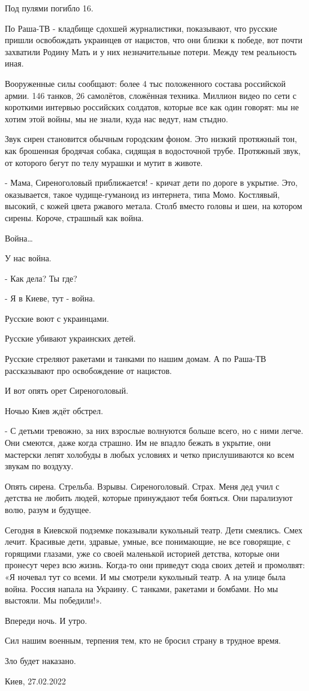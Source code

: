 Под пулями погибло 16. 

По Раша-ТВ - кладбище сдохшей журналистики, показывают, что русские пришли
освобождать украинцев от нацистов, что они близки к победе, вот почти захватили
Родину Мать и у них незначительные потери. Между тем реальность иная. 

Вооруженные силы сообщают: более 4 тыс положенного состава российской армии.
146 танков, 26 самолётов, сложённая техника. Миллион видео по сети с короткими
интервью российских солдатов, которые все как один говорят: мы не хотим этой
войны, мы не знали, куда нас ведут, нам стыдно. 

Звук сирен становится обычным городским фоном. Это низкий протяжный тон, как
брошенная бродячая собака, сидящая в водосточной трубе. Протяжный звук, от
которого бегут по телу мурашки и мутит в животе. 

- Мама, Сиреноголовый приближается! - кричат дети по дороге в укрытие. Это,
оказывается, такое чудище-гуманоид из интернета, типа Момо. Костлявый, высокий,
с кожей цвета ржавого метала. Столб вместо головы и шеи, на котором сирены.
Короче, страшный как война. 

Война…

У нас война.

- Как дела? Ты где? 

- Я в Киеве, тут - война. 

Русские воют с украинцами. 

Русские убивают украинских детей. 

Русские стреляют ракетами и танками по нашим домам. А по Раша-ТВ рассказывают
про освобождение от нацистов. 

И вот опять орет Сиреноголовый. 

Ночью Киев ждёт обстрел. 

- С детьми тревожно, за них взрослые волнуются больше всего, но с ними легче.
Они смеются, даже когда страшно. Им не впадло бежать в укрытие, они мастерски
лепят холобуды в любых условиях и четко прислушиваются ко всем звукам по
воздуху. 

Опять сирена. Стрельба. Взрывы. Сиреноголовый. Страх. Меня дед учил с детства
не любить людей, которые принуждают тебя бояться. Они парализуют волю, разум и
будущее. 

Сегодня в Киевской подземке показывали кукольный театр. Дети смеялись. Смех
лечит. Красивые дети, здравые, умные, все понимающие, не все говорящие, с
горящими глазами, уже со своей маленькой историей детства, которые они пронесут
через всю жизнь. Когда-то они приведут сюда своих детей и промолвят: «Я ночевал
тут со всеми. И мы смотрели кукольный театр. А на улице была война. Россия
напала на Украину. С танками, ракетами и бомбами. Но мы выстояли. Мы
победили!».

Впереди ночь. И утро.

Сил нашим военным, терпения тем, кто не бросил страну в трудное время. 

Зло будет наказано.

Киев, 27.02.2022
